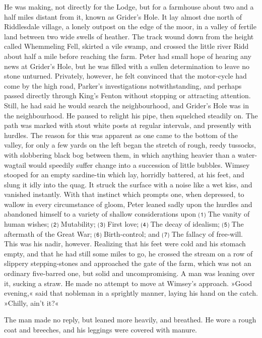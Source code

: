He was making, not directly for the Lodge, but for a farmhouse about two and a half miles distant from it, known as Grider's Hole. It lay almost due north of Riddlesdale village, a lonely outpost on the edge of the moor, in a valley of fertile land between two wide swells of heather. The track wound down from the height called Whemmeling Fell, skirted a vile swamp, and crossed the little river Ridd about half a mile before reaching the farm. Peter had small hope of hearing any news at Grider's Hole, but he was filled with a sullen determination to leave no stone unturned. Privately, however, he felt convinced that the motor-cycle had come by the high road, Parker's investigations notwithstanding, and perhaps passed directly through King's Fenton without stopping or attracting attention. Still, he had said he would search the neighbourhood, and Grider's Hole was in the neighbourhood. He paused to relight his pipe, then squelched steadily on. The path was marked with stout white posts at regular intervals, and presently with hurdles. The reason for this was apparent as one came to the bottom of the valley, for only a few yards on the left began the stretch of rough, reedy tussocks, with slobbering black bog between them, in which anything heavier than a water-wagtail would speedily suffer change into a succession of little bubbles. Wimsey stooped for an empty sardine-tin which lay, horridly battered, at his feet, and slung it idly into the quag. It struck the surface with a noise like a wet kiss, and vanished instantly. With that instinct which prompts one, when depressed, to wallow in every circumstance of gloom, Peter leaned sadly upon the hurdles and abandoned himself to a variety of shallow considerations upon ⑴ The vanity of human wishes; ⑵ Mutability; ⑶ First love; ⑷ The decay of idealism; ⑸ The aftermath of the Great War; ⑹ Birth-control; and ⑺ The fallacy of free-will. This was his nadir, however. Realizing that his feet were cold and his stomach empty, and that he had still some miles to go, he crossed the stream on a row of slippery stepping-stones and approached the gate of the farm, which was not an ordinary five-barred one, but solid and uncompromising. A man was leaning over it, sucking a straw. He made no attempt to move at Wimsey's approach. »Good evening,« said that nobleman in a sprightly manner, laying his hand on the catch. »Chilly, ain't it?«

The man made no reply, but leaned more heavily, and breathed. He wore a rough coat and breeches, and his leggings were covered with manure.

